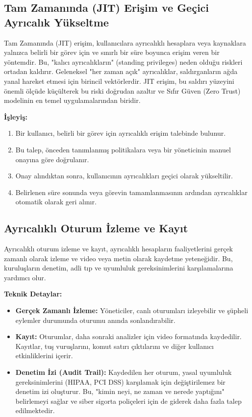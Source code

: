 \subsection{Tam Zamanında (JIT) Erişim ve Geçici Ayrıcalık Yükseltme}

Tam Zamanında (JIT) erişim, kullanıcılara ayrıcalıklı hesaplara veya kaynaklara yalnızca belirli bir görev için ve sınırlı bir süre boyunca erişim veren bir yöntemdir. Bu, "kalıcı ayrıcalıkların" (standing privileges) neden olduğu riskleri ortadan kaldırır. Geleneksel "her zaman açık" ayrıcalıklar, saldırganların ağda yanal hareket etmesi için birincil vektörlerdir. JIT erişim, bu saldırı yüzeyini önemli ölçüde küçülterek bu riski doğrudan azaltır ve Sıfır Güven (Zero Trust) modelinin en temel uygulamalarından biridir.

\textbf{İşleyiş:}
\begin{enumerate}
    \item Bir kullanıcı, belirli bir görev için ayrıcalıklı erişim talebinde bulunur.
    \item Bu talep, önceden tanımlanmış politikalara veya bir yöneticinin manuel onayına göre doğrulanır.
    \item Onay alındıktan sonra, kullanıcının ayrıcalıkları geçici olarak yükseltilir.
    \item Belirlenen süre sonunda veya görevin tamamlanmasının ardından ayrıcalıklar otomatik olarak geri alınır.
\end{enumerate}

\subsection{Ayrıcalıklı Oturum İzleme ve Kayıt}

Ayrıcalıklı oturum izleme ve kayıt, ayrıcalıklı hesapların faaliyetlerini gerçek zamanlı olarak izleme ve video veya metin olarak kaydetme yeteneğidir. Bu, kuruluşların denetim, adli tıp ve uyumluluk gereksinimlerini karşılamalarına yardımcı olur.

\textbf{Teknik Detaylar:}
\begin{itemize}
    \item \textbf{Gerçek Zamanlı İzleme:} Yöneticiler, canlı oturumları izleyebilir ve şüpheli eylemler durumunda oturumu anında sonlandırabilir.
    \item \textbf{Kayıt:} Oturumlar, daha sonraki analizler için video formatında kaydedilir. Kayıtlar, tuş vuruşlarını, komut satırı çıktılarını ve diğer kullanıcı etkinliklerini içerir.
    \item \textbf{Denetim İzi (Audit Trail):} Kaydedilen her oturum, yasal uyumluluk gereksinimlerini (HIPAA, PCI DSS) karşılamak için değiştirilemez bir denetim izi oluşturur. Bu, "kimin neyi, ne zaman ve nerede yaptığını" belirlemeyi sağlar ve siber sigorta poliçeleri için de giderek daha fazla talep edilmektedir.
\end{itemize}

